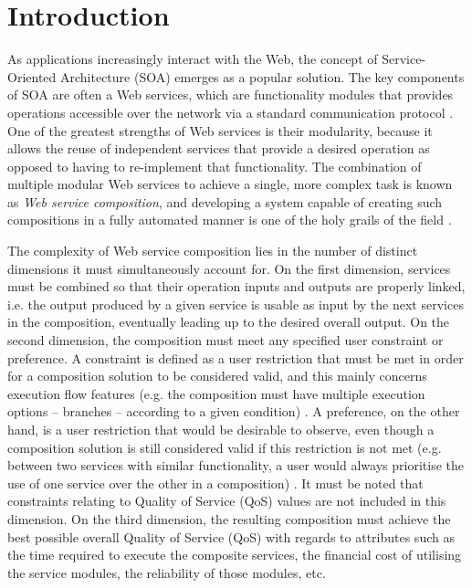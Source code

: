 \documentclass[conference]{IEEEtran}
\begin{document}
\section{Introduction}

As applications increasingly interact with the Web, the concept of Service-Oriented Architecture (SOA) \cite{perrey2003service}
emerges as a popular solution. The key components of SOA are often a Web services, which are functionality modules that
provides operations accessible over the network via a standard communication protocol \cite{gottschalk2002introduction}. One of the greatest
strengths of Web services is their modularity, because it allows the reuse of independent services that provide a
desired operation as opposed to having to re-implement that functionality. The combination of multiple modular Web services
to achieve a single, more complex task is known as \textit{Web service composition}, and developing a system capable of 
creating such compositions in a fully automated manner is one of the holy grails of the field \cite{milanovic2004current}.

The complexity of Web service composition lies in the number of distinct dimensions it must simultaneously account for. On
the first dimension, services must be combined so that their operation inputs and outputs are properly linked, i.e. the output
produced by a given service is usable as input by the next services in the composition, eventually leading up to the desired overall
output. On the second dimension, the composition must meet any specified user constraint or preference. A constraint is defined as a user restriction that must
be met in order for a composition solution to be considered valid, and this mainly concerns execution flow features (e.g. the composition must have
multiple execution options -- branches -- according to a given condition) \cite{wang2014automated,sohrabi2009web,karakoc2009composing}. A preference, on the other hand, is a user restriction that would
be desirable to observe, even though a composition solution is still considered valid if this restriction is not met (e.g. between two services with similar
functionality, a user would always prioritise the use of one service over the other in a composition) \cite{wang2014automated}. It must be noted that constraints relating to Quality of Service (QoS) values are not included in this dimension. On the third dimension, the resulting composition must achieve the best possible
overall Quality of Service (QoS) with regards to attributes such as the time required to execute the composite services, the
financial cost of utilising the service modules, the reliability of those modules, etc.
\end{document}
